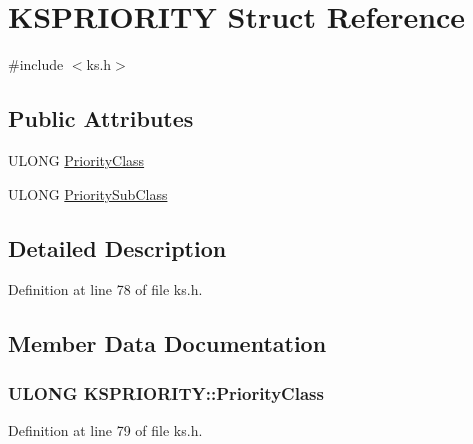 \hypertarget{struct_k_s_p_r_i_o_r_i_t_y}{}\section{K\+S\+P\+R\+I\+O\+R\+I\+TY Struct Reference}
\label{struct_k_s_p_r_i_o_r_i_t_y}


{\ttfamily \#include $<$ks.\+h$>$}

\subsection*{Public Attributes}
\begin{DoxyCompactItemize}
\item 
U\+L\+O\+NG \hyperlink{struct_k_s_p_r_i_o_r_i_t_y_a3c28c985e9d055cfacb901761311f75d}{Priority\+Class}
\item 
U\+L\+O\+NG \hyperlink{struct_k_s_p_r_i_o_r_i_t_y_afa60e98100c79a97dd08096c2db0df76}{Priority\+Sub\+Class}
\end{DoxyCompactItemize}


\subsection{Detailed Description}


Definition at line 78 of file ks.\+h.



\subsection{Member Data Documentation}
\subsubsection[{\texorpdfstring{Priority\+Class}{PriorityClass}}]{\setlength{\rightskip}{0pt plus 5cm}U\+L\+O\+NG K\+S\+P\+R\+I\+O\+R\+I\+T\+Y\+::\+Priority\+Class}\hypertarget{struct_k_s_p_r_i_o_r_i_t_y_a3c28c985e9d055cfacb901761311f75d}{}\label{struct_k_s_p_r_i_o_r_i_t_y_a3c28c985e9d055cfacb901761311f75d}


Definition at line 79 of file ks.\+h.

